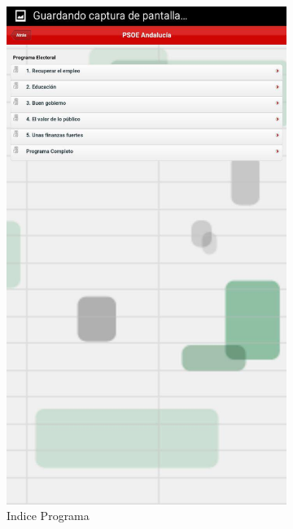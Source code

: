 \begin{figure}[H]
\begin{subfigure}[b]{0.3\textwidth}
                \includegraphics[width=\textwidth]{Media/Captures/psoeAndaluciaIndex.jpg}
                \caption{Indice Programa}
                \label{fig:psoeIndex}
        \end{subfigure}
        ~
        \begin{subfigure}[b]{0.3\textwidth}

\end{subfigure}
\end{figure}

